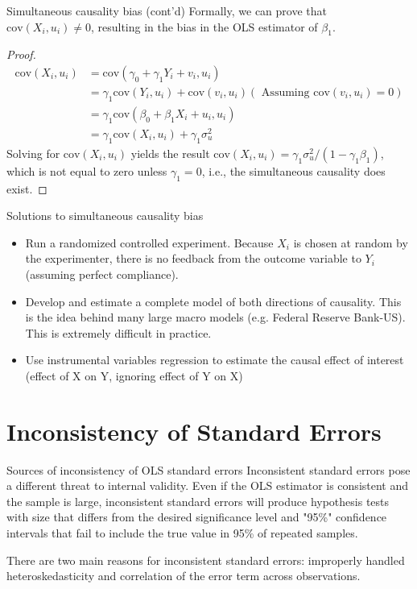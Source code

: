 \documentclass[presentation,10pt]{beamer}
\newcommand{\cov}{\mathrm{cov}}
\begin{document}
\begin{frame}[label={sec:org663a255}]{Simultaneous causality bias (cont'd)}
Formally, we can prove that \(\cov(X_i, u_i) \neq 0\), resulting in the
bias in the OLS estimator of \(\beta_1\). 
\begin{proof}
\begin{align*}
\cov(X_i, u_i) &= \cov(\gamma_0 + \gamma_1 Y_i + v_i, u_i) \\
&= \gamma_1\cov(Y_i, u_i) + \cov(v_i, u_i) (\text{ Assuming } \cov(v_i, u_i)=0) \\
&= \gamma_1\cov(\beta_0 + \beta_1 X_i + u_i, u_i) \\
&= \gamma_1\cov(X_i, u_i) + \gamma_1\sigma^2_u
\end{align*}
Solving for $\cov(X_i, u_i)$ yields the result 
$\cov(X_i, u_i) = \gamma_1 \sigma^2_u /(1-\gamma_1\beta_1)$, which is not
equal to zero unless $\gamma_1 = 0$, i.e., the simultaneous causality does
exist. 
\end{proof}
\end{frame}

\begin{frame}[label={sec:org69b64f2}]{Solutions to simultaneous causality bias}
\begin{itemize}
\item Run a randomized controlled experiment.  Because \(X_i\) is chosen at
random by the experimenter, there is no feedback from the outcome
variable to \(Y_i\) (assuming perfect compliance).
\item Develop and estimate a complete model of both directions of
causality.  This is the idea behind many large macro models
(e.g. Federal Reserve Bank-US).  This is extremely difficult in
practice.
\item Use instrumental variables regression to estimate the causal effect
of interest (effect of X on Y, ignoring effect of Y on X)
\end{itemize}
\end{frame}

\section{Inconsistency of Standard Errors}
\label{sec:org282e567}

\begin{frame}[label={sec:org0c88974}]{Sources of inconsistency of OLS standard errors}
Inconsistent standard errors pose a different threat to internal
validity. Even if the OLS estimator is consistent and the sample is
large, inconsistent standard errors will produce hypothesis tests with
size that differs from the desired significance level and "95\%"
confidence intervals that fail to include the true value in 95\% of
repeated samples. 

\vspace{0.3cm}
There are two main reasons for inconsistent standard errors:
improperly handled heteroskedasticity and correlation of the error
term across observations.
\end{frame}
\end{document}
